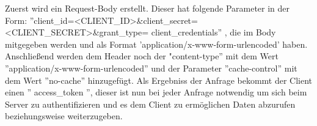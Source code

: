 Zuerst wird ein Request-Body erstellt. Dieser hat folgende Parameter in der Form: 
 ''client\_id=<CLIENT\_ID>\&client\_secret=<CLIENT\_SECRET>\&grant\_type=
 client\_credentials''
, die im Body mitgegeben werden und als Format 'application/x-www-form-urlencoded'  haben. Anschließend werden dem Header noch der "content-type'' mit dem Wert ''application/x-www-form-urlencoded'' und der Parameter ''cache-control'' mit dem Wert ''no-cache'' hinzugefügt. Als Ergebniss der Anfrage bekommt der Client einen '' access\_token '', dieser ist nun bei jeder Anfrage notwendig um sich beim Server zu authentifizieren und es dem Client zu ermöglichen Daten abzurufen beziehungsweise weiterzugeben.




